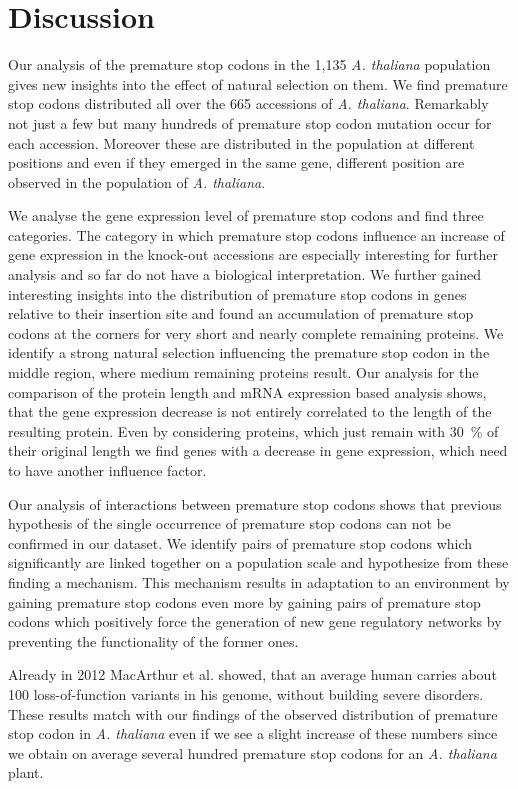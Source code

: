 \chapter{Discussion}
Our analysis of the premature stop codons in the 1,135 \textit{A. thaliana} population gives new insights into the effect of natural selection on them. We find premature stop codons distributed all over the 665 accessions of \textit{A. thaliana}. Remarkably not just a few but many hundreds of premature stop codon mutation occur for each accession.  Moreover these are distributed in the population at different positions and even if they emerged in the same gene, different position are observed in the population of \textit{A. thaliana}. 

We analyse the gene expression level of premature stop codons and find three categories. The category in which premature stop codons influence an increase of gene expression in the knock-out accessions are especially interesting for further analysis and so far do not have a biological interpretation. We further gained interesting insights into the distribution of premature stop codons in genes relative to their insertion site and found an accumulation of premature stop codons at the corners for very short and nearly complete remaining proteins. We identify a strong natural selection influencing the premature stop codon in the middle region, where medium remaining proteins result. Our analysis for the comparison of the protein length and mRNA expression based analysis shows, that the gene expression decrease is not entirely correlated to the length of the resulting protein. Even by considering proteins, which just remain with \SI{30}{\percent} of their original length we find genes with a decrease in gene expression, which need to have another influence factor. 

Our analysis of interactions between premature stop codons shows that previous hypothesis of the single occurrence of premature stop codons can not be confirmed in our dataset. We identify pairs of premature stop codons which significantly are linked together on a population scale and hypothesize from these finding a mechanism. This mechanism results in adaptation to an environment by gaining premature stop codons even more by gaining pairs of premature stop codons which positively force the generation of new gene regulatory networks by preventing the functionality of the former ones.  

Already in 2012 MacArthur et al. \cite{macarthur2012} showed, that an average human carries about 100 loss-of-function variants in his genome, without building severe disorders. These results match with our findings of the observed distribution of premature stop codon in \textit{A. thaliana} even if we see a slight increase of these numbers since we obtain on average several hundred premature stop codons for an \textit{A. thaliana} plant. 

